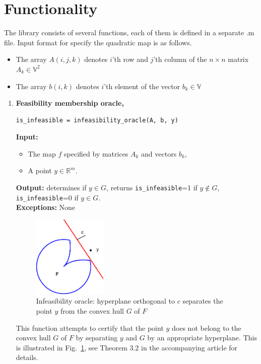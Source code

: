 \documentclass[a4paper]{article}
\theoremstyle{definition}
\begin{document}
\newpage

\section*{Functionality}
The library consists of several functions, each of them is defined in a separate .m file.
Input format for specify the quadratic map is as follows.

\begin{itemize}
\item The array $A(i, j, k)$ denotes $i$'th row and $j$'th column of the $n\times n$ matrix $A_k\in\mathbb{V}^2$
\item The array $b(i, k)$ denotes $i$'th element of the vector $b_k\in\mathbb{V}$
\end{itemize}

\begin{enumerate}
\item {\bf Feasibility membership oracle,\hskip 6pt}
\begin{verbatim}
is_infeasible = infeasibility_oracle(A, b, y)
\end{verbatim}
{\bf Input:}
\begin{itemize}
\item The map $f$ specified by matrices $A_k$ and vectors $b_k$,
\item A point $y\in\mathbb{R}^m$.
\end{itemize}
{\bf Output:} determines if $y\in G$, returns {\tt is\_infeasible}=1 if $y\notin G$, {\tt is\_infeasible}=0 if $y\in G$.\\
{\bf Exceptions:} None

\begin{figure}[H]
	\centering\includegraphics[width=100pt]{fig/infeasibility_oracle}
	\caption{Infeasibility oracle: hyperplane orthogonal to $c$ separates the point $y$ from the convex hull $G$ of $F$}
\label{fig:one}
\end{figure}

This function attempts to certify that the point $y$ does not belong to the convex hull $G$ of $F$ by separating $y$ and $G$ by an appropriate hyperplane.
This is illustrated in Fig.~\ref{fig:one}, see Theorem 3.2 in the accompanying article for details.


\end{enumerate}
\end{document}

